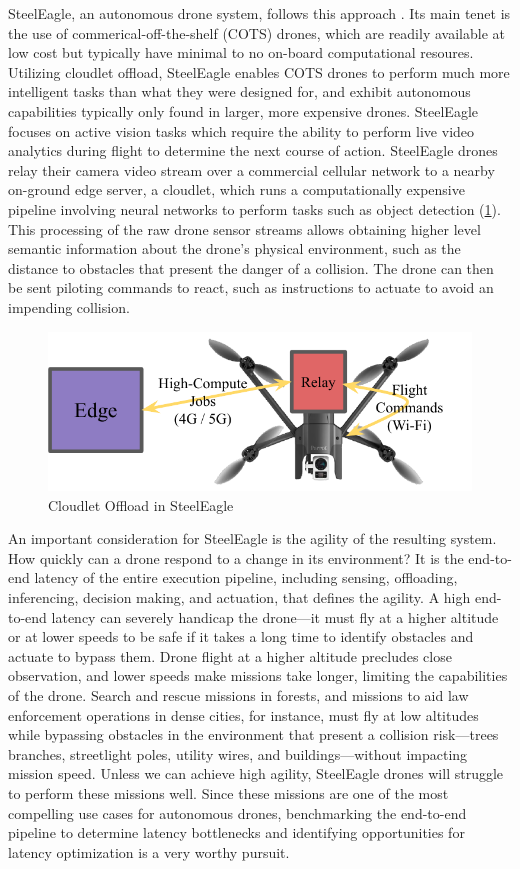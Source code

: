 SteelEagle, an autonomous drone system, follows this approach \cite{bala2024}.
Its main tenet is the use of commerical-off-the-shelf (COTS) drones, which are
readily available at low cost but typically have minimal to no on-board
computational resoures.  Utilizing cloudlet offload, SteelEagle enables COTS
drones to perform much more intelligent tasks than what they were designed for,
and exhibit autonomous capabilities typically only found in larger, more
expensive drones.  SteelEagle focuses on active vision tasks which require the
ability to perform live video analytics during flight to determine the next
course of action. SteelEagle drones relay their camera video stream over a
commercial cellular network to a nearby on-ground edge server, a cloudlet,
which runs a computationally expensive pipeline involving neural networks to
perform tasks such as object detection (\cref{fig:steeleagle-drone-arch}).  This processing of the raw drone
sensor streams allows obtaining higher level semantic information about the
drone's physical environment, such as the distance to obstacles that present
the danger of a collision. The drone can then be sent piloting commands to
react, such as instructions to actuate to avoid an impending collision.

\begin{figure}[htbp]
\centerline{\includegraphics[width = .6\textwidth]{figs/steeleagle-drone-arch-cropped.pdf}}
\caption{Cloudlet Offload in SteelEagle}
\label{fig:steeleagle-drone-arch}
\end{figure}

An important consideration for SteelEagle is the agility of the resulting
system.  How quickly can a drone respond to a change in its environment? It is
the end-to-end latency of the entire execution pipeline, including sensing,
offloading, inferencing, decision making, and actuation, that defines the
agility. A high end-to-end latency can severely handicap the drone---it must
fly at a higher altitude or at lower speeds to be safe if it takes a long time
to identify obstacles and actuate to bypass them. Drone flight at a higher
altitude precludes close observation, and lower speeds make missions take
longer, limiting the capabilities of the drone. Search and rescue missions in
forests, and missions to aid law enforcement operations in dense cities, for
instance, must fly at low altitudes while bypassing obstacles in the
environment that present a collision risk---trees branches, streetlight poles,
utility wires, and buildings---without impacting mission speed. Unless we can
achieve high agility, SteelEagle drones will struggle to perform these missions
well.  Since these missions are one of the most compelling use cases for
autonomous drones, benchmarking the end-to-end pipeline to determine latency
bottlenecks and identifying opportunities for latency optimization is a very
worthy pursuit.

